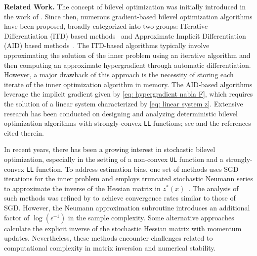 \documentclass[10pt]{article}
\theoremstyle{remark}
\begin{document}
\textbf{Related Work.} The concept of bilevel optimization was initially introduced in the work of \cite{bracken1973mathematical}. Since then, numerous gradient-based bilevel optimization algorithms have been proposed, broadly categorized into two groups: ITerative Differentiation (ITD) based methods~\cite{domke2012generic, maclaurin2015gradient, franceschi2018bilevel, grazzi2020iteration, ji2021bilevel} and Approximate Implicit Differentiation (AID) based methods~\cite{domke2012generic, pedregosa2016hyperparameter, gould2016differentiating, ghadimi2018approximation, grazzi2020iteration, ji2021bilevel, arbel2022amortized}. The ITD-based algorithms typically involve approximating the solution of the inner problem using an iterative algorithm and then computing an approximate hypergradient through automatic differentiation. However, a major drawback of this approach is the necessity of storing each iterate of the inner optimization algorithm in memory. The AID-based algorithms leverage the implicit gradient given by \eqref{eq: hypergradient nabla F}, which requires the solution of a linear system characterized by \eqref{eq: linear system z}. Extensive research has been conducted on designing and analyzing deterministic bilevel optimization algorithms with strongly-convex \texttt{LL} functions; see \cite{ji2021bilevel} and the references cited therein. 

In recent years, there has been a growing interest in stochastic bilevel optimization, especially in the setting of a non-convex \texttt{UL} function and a strongly-convex \texttt{LL} function. To address estimation bias, one set of methods uses SGD iterations for the inner problem and employs truncated stochastic Neumann series to approximate the inverse of the Hessian matrix in $z^*(x)$~\cite{ghadimi2018approximation, ji2021bilevel, yang2021provably, hong2023two, guo2021novel, khanduri2021near, chen2021closing, akhtar2022projection}. The analysis of such methods was refined by \cite{chen2021closing} to achieve convergence rates similar to those of SGD. However, the Neumann approximation subroutine introduces an additional factor of $\log(\epsilon^{-1})$ in the sample complexity. Some alternative approaches~\cite{arbel2022amortized, chen2022single, guo2021randomized, li2022fully} calculate the explicit inverse of the stochastic Hessian matrix with momentum updates. Nevertheless, these methods encounter challenges related to computational complexity in matrix inversion and numerical stability. 
\end{document}
